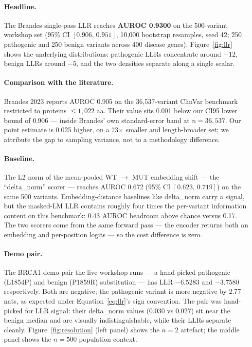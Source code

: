 \documentclass{article}
\begin{document}
\paragraph{Headline.} The Brandes single-pass LLR reaches \textbf{AUROC
0.9300} on the 500-variant workshop set (95\% CI \([0.906,\,0.951]\),
10{,}000 bootstrap resamples, seed 42; 250 pathogenic and 250 benign
variants across 400 disease genes). Figure~\ref{fig:llr} shows the
underlying distributions: pathogenic LLRs concentrate around
\(-12\), benign LLRs around \(-5\), and the two densities separate
along a single scalar.

\paragraph{Comparison with the literature.} Brandes 2023 reports AUROC
0.905 on the 36{,}537-variant ClinVar benchmark restricted to proteins
\(\leq 1{,}022\) aa. Their value sits 0.001 below our CI95 lower bound
of 0.906 --- inside Brandes' own standard-error band at \(n = 36{,}537\).
Our point estimate is 0.025 higher, on a 73\(\times\) smaller and
length-broader set; we attribute the gap to sampling variance, not to a
methodology difference.

\paragraph{Baseline.} The L2 norm of the mean-pooled WT \(\to\) MUT
embedding shift --- the \enquote{delta\_norm} scorer --- reaches AUROC
0.672 (95\% CI \([0.623,\,0.719]\)) on the same 500 variants.
Embedding-distance baselines like delta\_norm carry a signal, but the
masked-LM LLR contains roughly four times the per-variant information
content on this benchmark: 0.43 AUROC headroom above chance versus 0.17.
The two scorers come from the same forward pass --- the encoder returns
both an embedding and per-position logits --- so the cost difference is
zero.

\paragraph{Demo pair.} The BRCA1 demo pair the live workshop runs --- a
hand-picked pathogenic (L1854P) and benign (P1859R) substitution --- has
LLR \(-6.5283\) and \(-3.7580\) respectively. Both are negative; the
pathogenic variant is more negative by 2.77 nats, as expected under
Equation~\ref{eq:llr}'s sign convention. The pair was hand-picked for
LLR signal: their delta\_norm values (0.030 vs 0.027) sit near the
benign median and are visually indistinguishable, while their LLRs
separate cleanly. Figure~\ref{fig:resolution} (left panel) shows the
\(n = 2\) artefact; the middle panel shows the \(n = 500\) population
context.
\end{document}

